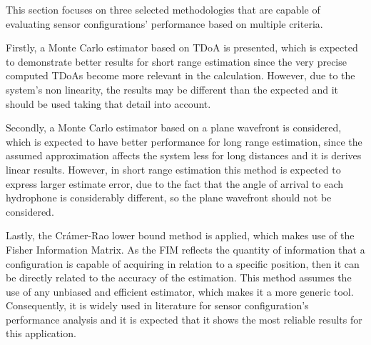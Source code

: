This section focuses on three selected methodologies that are capable of evaluating sensor configurations' performance based on multiple criteria. 

Firstly, a Monte Carlo estimator based on TDoA is presented, which is expected to demonstrate better results for short range estimation since the very precise computed TDoAs become more relevant in the calculation. However, due to the system's non linearity, the results may be different than the expected and it should be used taking that detail into account. 

Secondly, a Monte Carlo estimator based on a plane wavefront is considered, which is expected to have better performance for long range estimation, since the assumed approximation affects the system less for long distances and it is derives linear results. However, in short range estimation this method is expected to express larger estimate error, due to the fact that the angle of arrival to each hydrophone is considerably different, so the plane wavefront should not be considered.

Lastly, the Crámer-Rao lower bound method is applied, which makes use of the Fisher Information Matrix. As the FIM reflects the quantity of information that a configuration is capable of acquiring in relation to a specific position, then it can be directly related to the accuracy of the estimation. This method assumes the use of any unbiased and efficient estimator, which makes it a more generic tool. Consequently, it is widely used in literature for sensor configuration's performance analysis and it is expected that it shows the most reliable results for this application. 
